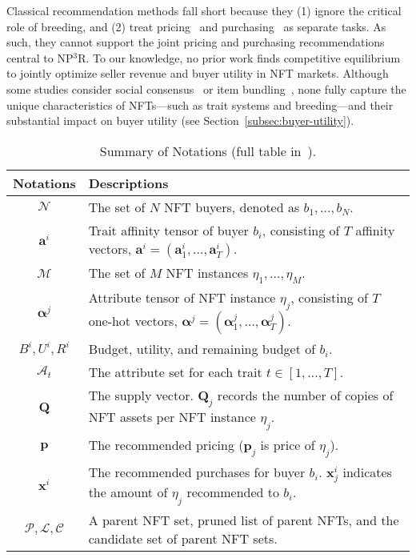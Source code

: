 \documentclass[conference]{IEEEtran}
\theoremstyle{plain}
\begin{document}
Classical recommendation methods fall short because they (1) ignore the critical role of breeding, and (2) treat pricing~\cite{zhang2022multi, zhu2022modeling} and purchasing~\cite{he2020lightgcn, yang2021consisrec} as separate tasks. As such, they cannot support the joint pricing and purchasing recommendations central to NP$^3$R. To our knowledge, no prior work finds competitive equilibrium to jointly optimize seller revenue and buyer utility in NFT markets. Although some studies consider social consensus~\cite{zhang2017item, xiao2017fairness} or item bundling~\cite{chang2020bundle}, none fully capture the unique characteristics of NFTs—such as trait systems and breeding—and their substantial impact on buyer utility (see Section~\ref{subsec:buyer-utility}).

\begin{table}
    \caption{Summary of Notations (full table in~\cite{supplementary}).}
    \label{tab:notationfull}
    \centering
    \begin{tabular}{c|p{.7\linewidth}}
    \toprule
    Notations & Descriptions \\
    \midrule
    $\mathcal{N}$ & The set of $N$ NFT buyers, denoted as $b_1, \ldots, b_N$.\\
    $\mathbf{a}^i$ & Trait affinity tensor of buyer $b_i$, consisting of $T$ affinity vectors, $\mathbf{a}^i = (\mathbf{a}^i_1, \ldots, \mathbf{a}^i_T)$.\\
    $\mathcal{M}$ & The set of $M$ NFT instances $\eta_1, \ldots, \eta_M$.\\
    $\bm{\alpha}^j$ & Attribute tensor of NFT instance $\eta_j$, consisting of $T$ one-hot vectors, $\bm{\alpha}^j = (\bm{\alpha}^j_1, \ldots, \bm{\alpha}^j_T)$.\\
    $B^i, U^i, R^i$ & Budget, utility, and remaining budget of $b_i$.\\
    $\mathcal{A}_t$ & The attribute set for each trait $t\in[1,\ldots,T]$.\\
    $\mathbf{Q}$ &  The supply vector. $\mathbf{Q}_j$ records the number of copies of NFT assets per NFT instance $\eta_j$.\\
    $\mathbf{p}$ & The recommended pricing ($\mathbf{p}_j$ is price of $\eta_j$).\\
    $\mathbf{x}^i$ & The recommended purchases for buyer $b_i$. $\mathbf{x}^i_j$ indicates the amount of $\eta_j$ recommended to $b_i$.\\
    $\mathcal{P}, \mathcal{L}, \mathcal{C}$ & A parent NFT set, pruned list of parent NFTs, and the candidate set of parent NFT sets.\\

\end{tabular}
\end{table}
\end{document}
